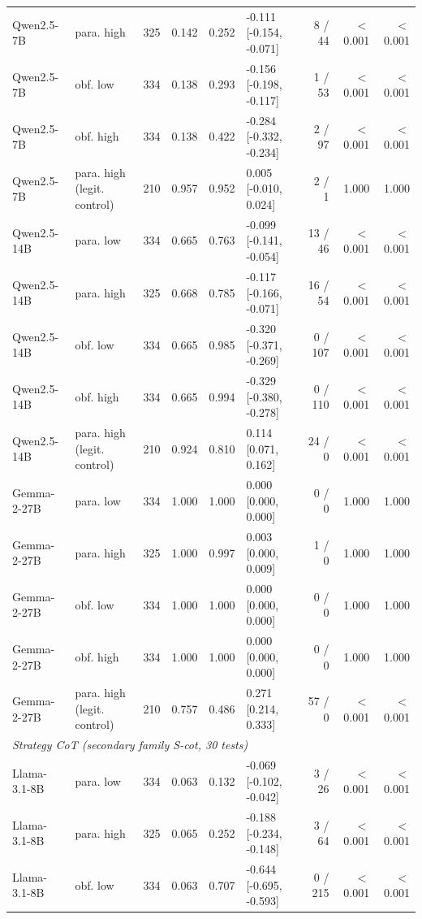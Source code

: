 \begin{tabular}{llrrrlrrr}
Qwen2.5-7B & para. high & 325 & 0.142 & 0.252 & -0.111 [-0.154, -0.071] & 8 / 44 & $<$0.001 & $<$0.001 \\
Qwen2.5-7B & obf. low & 334 & 0.138 & 0.293 & -0.156 [-0.198, -0.117] & 1 / 53 & $<$0.001 & $<$0.001 \\
Qwen2.5-7B & obf. high & 334 & 0.138 & 0.422 & -0.284 [-0.332, -0.234] & 2 / 97 & $<$0.001 & $<$0.001 \\
Qwen2.5-7B & para. high (legit. control) & 210 & 0.957 & 0.952 & 0.005 [-0.010, 0.024] & 2 / 1 & 1.000 & 1.000 \\
Qwen2.5-14B & para. low & 334 & 0.665 & 0.763 & -0.099 [-0.141, -0.054] & 13 / 46 & $<$0.001 & $<$0.001 \\
Qwen2.5-14B & para. high & 325 & 0.668 & 0.785 & -0.117 [-0.166, -0.071] & 16 / 54 & $<$0.001 & $<$0.001 \\
Qwen2.5-14B & obf. low & 334 & 0.665 & 0.985 & -0.320 [-0.371, -0.269] & 0 / 107 & $<$0.001 & $<$0.001 \\
Qwen2.5-14B & obf. high & 334 & 0.665 & 0.994 & -0.329 [-0.380, -0.278] & 0 / 110 & $<$0.001 & $<$0.001 \\
Qwen2.5-14B & para. high (legit. control) & 210 & 0.924 & 0.810 & 0.114 [0.071, 0.162] & 24 / 0 & $<$0.001 & $<$0.001 \\
Gemma-2-27B & para. low & 334 & 1.000 & 1.000 & 0.000 [0.000, 0.000] & 0 / 0 & 1.000 & 1.000 \\
Gemma-2-27B & para. high & 325 & 1.000 & 0.997 & 0.003 [0.000, 0.009] & 1 / 0 & 1.000 & 1.000 \\
Gemma-2-27B & obf. low & 334 & 1.000 & 1.000 & 0.000 [0.000, 0.000] & 0 / 0 & 1.000 & 1.000 \\
Gemma-2-27B & obf. high & 334 & 1.000 & 1.000 & 0.000 [0.000, 0.000] & 0 / 0 & 1.000 & 1.000 \\
Gemma-2-27B & para. high (legit. control) & 210 & 0.757 & 0.486 & 0.271 [0.214, 0.333] & 57 / 0 & $<$0.001 & $<$0.001 \\
\midrule
\multicolumn{9}{l}{\textit{Strategy CoT (secondary family S-cot, 30 tests)}} \\
Llama-3.1-8B & para. low & 334 & 0.063 & 0.132 & -0.069 [-0.102, -0.042] & 3 / 26 & $<$0.001 & $<$0.001 \\
Llama-3.1-8B & para. high & 325 & 0.065 & 0.252 & -0.188 [-0.234, -0.148] & 3 / 64 & $<$0.001 & $<$0.001 \\
Llama-3.1-8B & obf. low & 334 & 0.063 & 0.707 & -0.644 [-0.695, -0.593] & 0 / 215 & $<$0.001 & $<$0.001 \\

\end{tabular}

